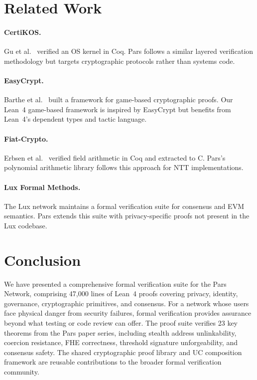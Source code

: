 \documentclass[11pt,a4paper]{article}
\begin{document}
\section{Related Work}
\label{sec:related}

\paragraph{CertiKOS.}  Gu et al.~\cite{certikos2016} verified an OS
kernel in Coq.  Pars follows a similar layered verification methodology
but targets cryptographic protocols rather than systems code.

\paragraph{EasyCrypt.}  Barthe et al.~\cite{easycrypt2013} built a
framework for game-based cryptographic proofs.  Our Lean~4 game-based
framework is inspired by EasyCrypt but benefits from Lean~4's dependent
types and tactic language.

\paragraph{Fiat-Crypto.}  Erbsen et al.~\cite{fiatcrypto2019} verified
field arithmetic in Coq and extracted to C.  Pars's polynomial arithmetic
library follows this approach for NTT implementations.

\paragraph{Lux Formal Methods.}  The Lux network maintains a formal
verification suite for consensus and EVM semantics.  Pars extends this
suite with privacy-specific proofs not present in the Lux codebase.

\section{Conclusion}
\label{sec:conclusion}

We have presented a comprehensive formal verification suite for the Pars
Network, comprising 47{,}000 lines of Lean~4 proofs covering privacy,
identity, governance, cryptographic primitives, and consensus.  For a
network whose users face physical danger from security failures, formal
verification provides assurance beyond what testing or code review can
offer.  The proof suite verifies 23 key theorems from the Pars paper
series, including stealth address unlinkability, coercion resistance,
FHE correctness, threshold signature unforgeability, and consensus
safety.  The shared cryptographic proof library and UC composition
framework are reusable contributions to the broader formal verification
community.
\end{document}
